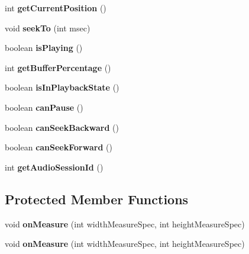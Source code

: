 \begin{DoxyCompactItemize}
int {\bfseries get\+Current\+Position} ()
\item 
\mbox{\label{classorg_1_1cocos2dx_1_1lib_1_1Cocos2dxVideoView_a9f3d3e52e6224608b0ac0b2c1a09d5db}} 
void {\bfseries seek\+To} (int msec)
\item 
\mbox{\label{classorg_1_1cocos2dx_1_1lib_1_1Cocos2dxVideoView_afe1a186a310c69df638db011d0bca727}} 
boolean {\bfseries is\+Playing} ()
\item 
\mbox{\label{classorg_1_1cocos2dx_1_1lib_1_1Cocos2dxVideoView_ad2c7d917c2a0f63adcf15b0ba2ab79e8}} 
int {\bfseries get\+Buffer\+Percentage} ()
\item 
\mbox{\label{classorg_1_1cocos2dx_1_1lib_1_1Cocos2dxVideoView_aa6c4d06c2651b06022d7658d397543a1}} 
boolean {\bfseries is\+In\+Playback\+State} ()
\item 
\mbox{\label{classorg_1_1cocos2dx_1_1lib_1_1Cocos2dxVideoView_a12135a893ab3e0234e1560509c8f0adb}} 
boolean {\bfseries can\+Pause} ()
\item 
\mbox{\label{classorg_1_1cocos2dx_1_1lib_1_1Cocos2dxVideoView_afdb218a12b7f5115d46dba5870f12fa9}} 
boolean {\bfseries can\+Seek\+Backward} ()
\item 
\mbox{\label{classorg_1_1cocos2dx_1_1lib_1_1Cocos2dxVideoView_a11c0408b0871d6ba2a95afb3991d6c30}} 
boolean {\bfseries can\+Seek\+Forward} ()
\item 
\mbox{\label{classorg_1_1cocos2dx_1_1lib_1_1Cocos2dxVideoView_a3fdf62fe54b0502aaea0a7378abca41e}} 
int {\bfseries get\+Audio\+Session\+Id} ()
\end{DoxyCompactItemize}
\subsection*{Protected Member Functions}
\begin{DoxyCompactItemize}
\item 
\mbox{\label{classorg_1_1cocos2dx_1_1lib_1_1Cocos2dxVideoView_a52fc5c072e943bfb7e7414b900b8e069}} 
void {\bfseries on\+Measure} (int width\+Measure\+Spec, int height\+Measure\+Spec)
\item 
\mbox{\label{classorg_1_1cocos2dx_1_1lib_1_1Cocos2dxVideoView_a52fc5c072e943bfb7e7414b900b8e069}} 
void {\bfseries on\+Measure} (int width\+Measure\+Spec, int height\+Measure\+Spec)
\end{DoxyCompactItemize}
